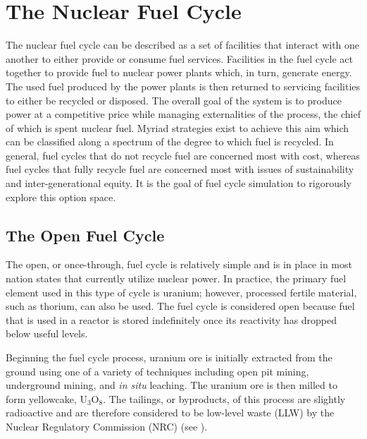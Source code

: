 
\section{The Nuclear Fuel Cycle}

The nuclear fuel cycle can be described as a set of facilities that interact
with one another to either provide or consume fuel services. Facilities in the
fuel cycle act together to provide fuel to nuclear power plants which, in turn,
generate energy. The used fuel produced by the power plants is then returned to
servicing facilities to either be recycled or disposed. The overall goal of the
system is to produce power at a competitive price while managing externalities
of the process, the chief of which is spent nuclear fuel. Myriad strategies
exist to achieve this aim which can be classified along a spectrum of the degree
to which fuel is recycled. In general, fuel cycles that do not recycle fuel are
concerned most with cost, whereas fuel cycles that fully recycle fuel are
concerned most with issues of sustainability and inter-generational equity. It is
the goal of fuel cycle simulation to rigorously explore this option space.

\subsection{The Open Fuel Cycle}

The open, or once-through, fuel cycle is relatively simple and is in place in
most nation states that currently utilize nuclear power. In practice, the primary
fuel element used in this type of cycle is uranium; however, processed fertile
material, such as thorium, can also be used. The fuel cycle is considered open
because fuel that is used in a reactor is stored indefinitely once its
reactivity has dropped below useful levels.

Beginning the fuel cycle process, uranium ore is initially extracted from the
ground using one of a variety of techniques including open pit mining,
underground mining, and \textit{in situ} leaching. The uranium ore is then
milled to form yellowcake, $\mathrm{U_3O_8}$. The tailings, or byproducts, of
this process are slightly radioactive and are therefore considered to be
low-level waste (LLW) by the Nuclear Regulatory Commission (NRC)
(see \cite{nrc_10_1985}).

